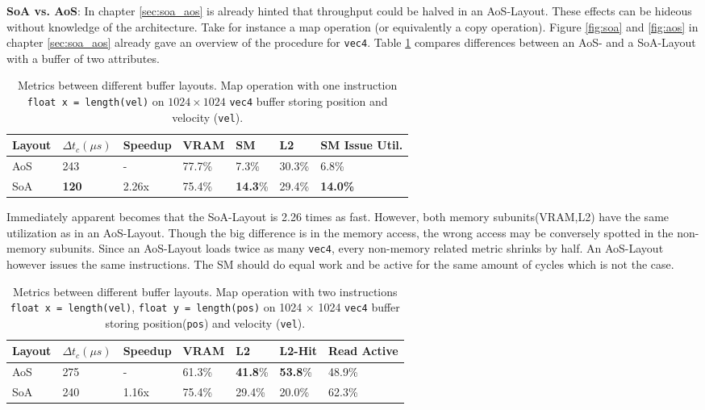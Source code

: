 \documentclass[m,times]{cgMA}
\begin{document}
\textbf{SoA vs. AoS}: In chapter \ref{sec:soa_aos} is already hinted that throughput could be halved in an AoS-Layout. These effects can be hideous without knowledge of the architecture. Take for instance a map operation (or equivalently a copy operation). Figure \ref{fig:soa} and \ref{fig:aos} in chapter \ref{sec:soa_aos} already gave an overview of the procedure for \texttt{vec4}. Table \ref{tab:map_1} compares differences between an AoS- and a SoA-Layout with a buffer of two attributes.
\begin{table}[htbp]
  \begin{tabular}{ | l | l | l | l | l | l | l |}    \hline
    Layout &  $\Delta t_c (\mu s)$	& Speedup &VRAM     & SM     & L2     & SM Issue Util. \\\hline
    AoS         & 243                   & -       &77.7\%   & 7.3\%  & 30.3\% & 6.8\% \\\hline
    SoA         & \textbf{120}                   & 2.26x   &75.4\%   & \textbf{14.3}\% & 29.4\% & \textbf{14.0\%} \\
    \hline
  \end{tabular}
\caption{Metrics between different buffer layouts. Map operation with one instruction \texttt{float x = length(vel)} on $1024 \times 1024$ \texttt{vec4} buffer storing position and velocity (\texttt{vel}).}
\label{tab:map_1}
\end{table}

Immediately apparent becomes that the SoA-Layout is 2.26 times as fast. However, both memory subunits(VRAM,L2) have the same utilization as in an AoS-Layout. Though the big difference is in the memory access, the wrong access may be conversely spotted in the non-memory subunits. Since an AoS-Layout loads twice as many \texttt{vec4}, every non-memory related metric shrinks by half. An AoS-Layout however issues the same instructions. The SM should do equal work and be active for the same amount of cycles which is not the case.
\begin{table}[htpb]
  \begin{tabular}{ | l | l | l | l | l | l | l |}    \hline
    Layout &  $\Delta t_c (\mu s)$ & Speedup       &VRAM             & L2              & L2-Hit & Read Active \\\hline
    AoS         & 275                   & -        &61.3\%           & \textbf{41.8}\% & \textbf{53.8}\% & 48.9\% \\\hline
    SoA         & 240                   & 1.16x    &75.4\%  & 29.4\%          & 20.0\% & 62.3\% \\
    \hline
  \end{tabular}
\caption{Metrics between different buffer layouts. Map operation with two instructions \texttt{float x = length(vel)}, \texttt{float y = length}\texttt{(pos)} on 1024 $\times$ 1024 \texttt{vec4} buffer storing position(\texttt{pos}) and velocity (\texttt{vel}).}
\label{tab:map_2}
\end{table}
\end{document}
